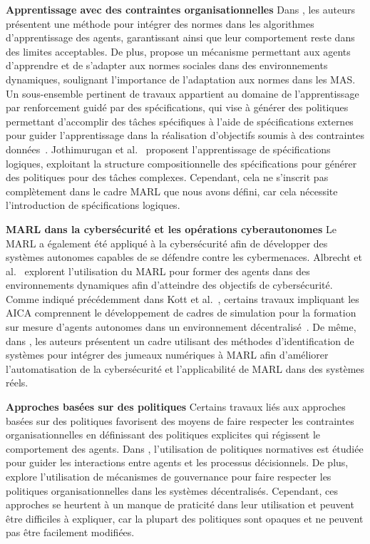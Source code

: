 \textbf{Apprentissage avec des contraintes organisationnelles} \quad
Dans \cite{cruz2020norms}, les auteurs présentent une méthode pour intégrer des normes dans les algorithmes d'apprentissage des agents, garantissant ainsi que leur comportement reste dans des limites acceptables. De plus, \cite{villatoro2011social} propose un mécanisme permettant aux agents d'apprendre et de s'adapter aux normes sociales dans des environnements dynamiques, soulignant l'importance de l'adaptation aux normes dans les MAS.
%
Un sous-ensemble pertinent de travaux appartient au domaine de l'apprentissage par renforcement guidé par des spécifications, qui vise à générer des politiques permettant d'accomplir des tâches spécifiques à l'aide de spécifications externes pour guider l'apprentissage dans la réalisation d'objectifs soumis à des contraintes données~\cite{Bansal2022}. Jothimurugan et al.~\cite{Jothimurugan2021} proposent l'apprentissage de spécifications logiques, exploitant la structure compositionnelle des spécifications pour générer des politiques pour des tâches complexes. Cependant, cela ne s'inscrit pas complètement dans le cadre MARL que nous avons défini, car cela nécessite l'introduction de spécifications logiques.

\textbf{MARL dans la cybersécurité et les opérations cyberautonomes} \quad
Le MARL a également été appliqué à la cybersécurité afin de développer des systèmes autonomes capables de se défendre contre les cybermenaces. Albrecht et al.~\cite{Albrecht2024} explorent l'utilisation du MARL pour former des agents dans des environnements dynamiques afin d'atteindre des objectifs de cybersécurité.
Comme indiqué précédemment dans Kott et al.~\cite{Kott2023}, certains travaux impliquant les AICA comprennent le développement de cadres de simulation pour la formation sur mesure d'agents autonomes dans un environnement décentralisé~\cite{Drasar2020}.
De même, dans \cite{Hammar2022}, les auteurs présentent un cadre utilisant des méthodes d'identification de systèmes pour intégrer des jumeaux numériques à MARL afin d'améliorer l'automatisation de la cybersécurité et l'applicabilité de MARL dans des systèmes réels.

\textbf{Approches basées sur des politiques} \quad
Certains travaux liés aux approches basées sur des politiques favorisent des moyens de faire respecter les contraintes organisationnelles en définissant des politiques explicites qui régissent le comportement des agents. Dans \cite{krupanski2015norm}, l'utilisation de politiques normatives est étudiée pour guider les interactions entre agents et les processus décisionnels. De plus, \cite{vos2020governing} explore l'utilisation de mécanismes de gouvernance pour faire respecter les politiques organisationnelles dans les systèmes décentralisés. Cependant, ces approches se heurtent à un manque de praticité dans leur utilisation et peuvent être difficiles à expliquer, car la plupart des politiques sont opaques et ne peuvent pas être facilement modifiées.

